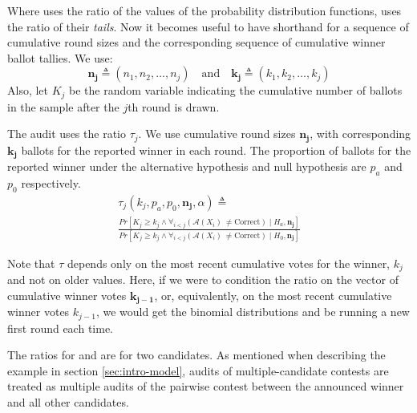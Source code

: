 Where \BRAVO uses the ratio of the values of the probability distribution functions, \Minerva uses the ratio of their \emph{tails}. Now it becomes useful to have shorthand for a sequence of cumulative round sizes and the corresponding sequence
of cumulative winner ballot tallies.
We use:
$$\bm{n_j}\triangleq(n_1,n_2,\ldots,n_j) \quad\text{and}\quad \bm{k_j}\triangleq(k_1,k_2,\ldots,k_j)$$
Also, let $K_j$ be the random variable indicating the cumulative number of ballots in the sample after the $j$th round is drawn.

\begin{definition} \label{def:minerva_ratio} The \R \Minerva audit uses the ratio $\tau_j$. We use cumulative round sizes $\bm{n_j}$, with corresponding $\bm{k_j}$ ballots for the reported winner in each round. The proportion of ballots for the reported winner under the alternative hypothesis and null hypothesis are $p_a$ and $p_0$ respectively.
         \begin{equation}
         \begin{aligned}
             \label{eqn:tau}
                 \tau_{j}(k_{j}, p_a,p_0, \bm{n_j}, \alpha )  \triangleq\\
                 \frac{Pr[K_{j} \geq k_{j} \wedge \forall_{i < j} ({\mathcal{A}}(X_i) ~\neq \text{Correct}) \mid H_a, \bm{n_j}]}{Pr[K_{j} \geq k_{j} \wedge \forall_{i < j} ({\mathcal{A}}(X_i) ~\neq \text{Correct}) \mid H_0, \bm{n_j}]}
         \end{aligned}
         \end{equation}
\end{definition}

Note that $\tau$ depends only on the most recent cumulative votes for the winner, $k_j$ and not on older values. Here, if we were to condition the ratio on the vector of cumulative winner votes $\bm{k_{j-1}}$, or, equivalently, on the most recent cumulative winner votes ${k_{j-1}}$, we would get the binomial distributions and be running a new first round each time. 

The ratios for \BRAVO and \Minerva are for two candidates. As mentioned when describing the example in section \ref{sec:intro-model}, audits of multiple-candidate contests are treated as multiple audits of the pairwise contest between the announced winner and all other candidates. 

